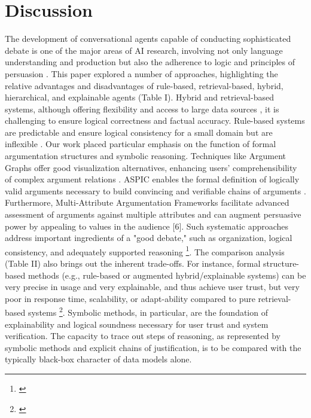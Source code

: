 \documentclass[conference]{IEEEtran}
\begin{document}
\section{Discussion}
The development of conversational agents capable of conducting sophisticated debate is one of the major areas of AI research, involving not only language understanding and production but also the adherence to logic and principles of persuasion \cite{rakshit2019debbie}. This paper explored a number of approaches, highlighting the relative advantages and disadvantages of rule-based, retrieval-based, hybrid, hierarchical, and explainable agents (Table I). Hybrid and retrieval-based systems, although offering flexibility and access to large data sources \cite{kulatska2019arguebot}, it is challenging to ensure logical correctness and factual accuracy. Rule-based systems are predictable and ensure logical consistency for a small domain but are inflexible \cite{montealto2021rulebased}.
Our work placed particular emphasis on the function of formal argumentation structures and symbolic reasoning. Techniques like Argument Graphs offer good visualization alternatives, enhancing users' comprehensibility of complex argument relations \cite{chalaguine2020persuasive}\cite{engelmann2022argumentation}. ASPIC enables the formal definition of logically valid arguments necessary to build convincing and verifiable chains of arguments \cite{engelmann2022argumentation}. Furthermore, Multi-Attribute Argumentation Frameworks facilitate advanced assessment of arguments against multiple attributes and can augment persuasive power by appealing to values in the audience [6]. Such systematic approaches address important ingredients of a "good debate," such as organization, logical consistency, and adequately supported reasoning \footnote{\label{debatingforeveryonejudge}\debatingforeveryonejudge}.
The comparison analysis (Table II) also brings out the inherent trade-offs. For instance, formal structure-based methods (e.g., rule-based or augmented hybrid/explainable systems) can be very precise in usage and very explainable, and thus achieve user trust, but very poor in response time, scalability, or adapt-ability compared to pure retrieval-based systems \footnote{\label{smythosperformance}\smythosperformance}.
Symbolic methods, in particular, are the foundation of explainability and logical soundness necessary for user trust and system verification. The capacity to trace out steps of reasoning, as represented by symbolic methods and explicit chains of justification, is to be compared with the typically black-box character of data models alone.
\end{document}

